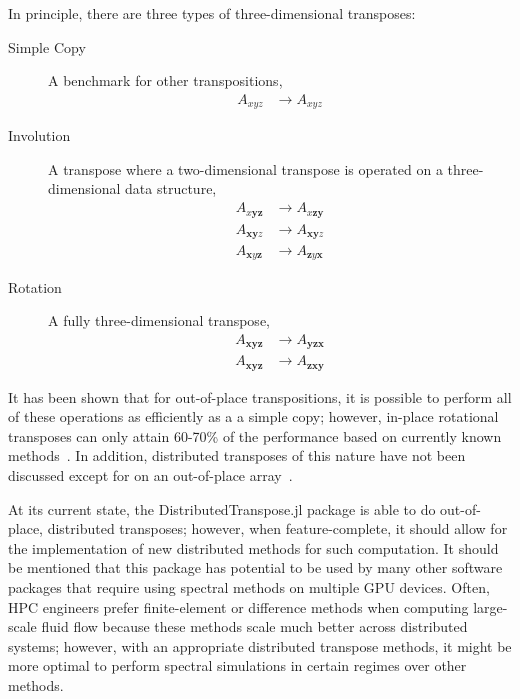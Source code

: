 In principle, there are three types of three-dimensional transposes:

\begin{description}
\item[Simple Copy]{A benchmark for other transpositions,
    \begin{align}
    A_{xyz} &\rightarrow A_{xyz}
    \end{align}}
\item[Involution]{A transpose where a two-dimensional transpose is operated on a three-dimensional data structure,
    \begin{align}
    A_{x\mathbf{yz}} &\rightarrow A_{x\mathbf{zy}} \\
    A_{\mathbf{xy}z} &\rightarrow A_{\mathbf{xy}z} \\
    A_{\mathbf{x}y\mathbf{z}} &\rightarrow A_{\mathbf{z}y\mathbf{x}}
    \end{align}}
\item[Rotation]{A fully three-dimensional transpose,
    \begin{align}
    A_{\mathbf{xyz}} &\rightarrow A_{\mathbf{yzx}} \\
    A_{\mathbf{xyz}} &\rightarrow A_{\mathbf{zxy}}
    \end{align}}
\end{description}

It has been shown that for out-of-place transpositions, it is possible to perform all of these operations as efficiently as a a simple copy; however, in-place rotational transposes can only attain 60-70\% of the performance based on currently known methods~\cite{jodra2015, el2008}.
In addition, distributed transposes of this nature have not been discussed except for on an out-of-place array~\cite{ruetsch2013}.

At its current state, the DistributedTranspose.jl package is able to do out-of-place, distributed transposes; however, when feature-complete, it should allow for the implementation of new distributed methods for such computation.
It should be mentioned that this package has potential to be used by many other software packages that require using spectral methods on multiple GPU devices.
Often, HPC engineers prefer finite-element or difference methods when computing large-scale fluid flow because these methods scale much better across distributed systems; however, with an appropriate distributed transpose methods, it might be more optimal to perform spectral simulations in certain regimes over other methods.

